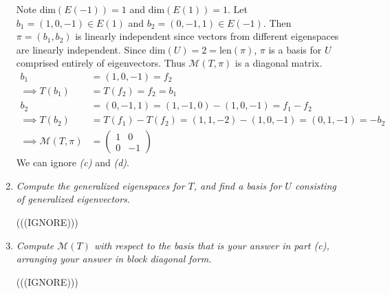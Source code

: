 \documentclass[12pt]{article}
\begin{document}
\begin{enumerate}[\ \ \it(a)\ \ ]
	\noindent Note $\text{dim}(E(-1)) = 1$ and $\text{dim}(E(1)) = 1$.  Let $b_1 = (1, 0, -1) \in E(1)$ and $b_2 = (0, -1, 1) \in E(-1)$.  Then $\pi = (b_1, b_2)$ is linearly independent since vectors from different eigenspaces are linearly independent.  Since $\text{dim}(U) = 2 = \text{len}(\pi)$, $\pi$ is a basis for $U$ comprised entirely of eigenvectors.  Thus $\mathcal{M}(T, \pi)$ is a diagonal matrix.
	\begin{align*}
		b_1 &= (1, 0, -1) = f_2 \\
		\implies T(b_1) &= T(f_2) = f_2 = b_1 \\
		b_2 &= (0, -1, 1) = (1, -1, 0) - (1, 0, -1)  = f_1 - f_2 \\
		\implies T(b_2) &= T(f_1) - T(f_2) = (1, 1, -2) - (1, 0, -1) = (0, 1, -1) = -b_2 \\
		\implies \mathcal{M}(T, \pi) &= \left(\begin{array}{cc}
			1 & 0 \\
			0 & -1
		\end{array}\right)
	\end{align*}
	We can ignore {\it(c)} and {\it(d)}.
	\item {\it Compute the generalized eigenspaces for $T$, and find a basis for $U$ consisting of generalized eigenvectors.}

	\noindent (((IGNORE)))
	\item {\it Compute $\mathcal{M}(T)$ with respect to the basis that is your answer in part (c), arranging your answer in block diagonal form.}

	\noindent (((IGNORE)))
\end{enumerate}
\end{document}
